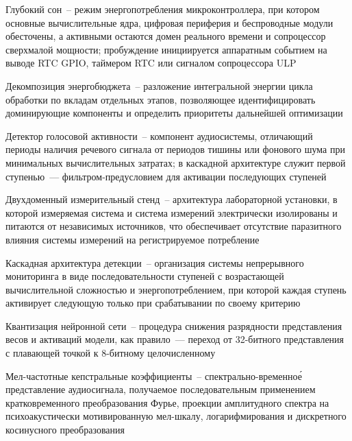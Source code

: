 
\begingroup
\setlength{\parindent}{0pt}
\setlength{\parskip}{0pt}
\newcommand{\term}[2]{%
	\noindent #1~-- #2\par
	\vspace{0.4em}
}

\term{Глубокий сон}{режим энергопотребления микроконтроллера, при котором основные вычислительные ядра, цифровая периферия и беспроводные модули обесточены, а активными остаются домен реального времени и сопроцессор сверхмалой мощности; пробуждение инициируется аппаратным событием на выводе RTC GPIO, таймером RTC или сигналом сопроцессора ULP}

\term{Декомпозиция энергобюджета}{разложение интегральной энергии цикла обработки по вкладам отдельных этапов, позволяющее идентифицировать доминирующие компоненты и определить приоритеты дальнейшей оптимизации}

\term{Детектор голосовой активности}{компонент аудиосистемы, отличающий периоды наличия речевого сигнала от периодов тишины или фонового шума при минимальных вычислительных затратах; в каскадной архитектуре служит первой ступенью~--- фильтром-предусловием для активации последующих ступеней}

\term{Двухдоменный измерительный стенд}{архитектура лабораторной установки, в которой измеряемая система и система измерений электрически изолированы и питаются от независимых источников, что обеспечивает отсутствие паразитного влияния системы измерений на регистрируемое потребление}

\term{Каскадная архитектура детекции}{организация системы непрерывного мониторинга в виде последовательности ступеней с возрастающей вычислительной сложностью и энергопотреблением, при которой каждая ступень активирует следующую только при срабатывании по своему критерию}

\term{Квантизация нейронной сети}{процедура снижения разрядности представления весов и активаций модели, как правило~--- переход от 32-битного представления с плавающей точкой к 8-битному целочисленному}

\term{Мел-частотные кепстральные коэффициенты}{спектрально-временно\'{е} представление аудиосигнала, получаемое последовательным применением кратковременного преобразования Фурье, проекции амплитудного спектра на психоакустически мотивированную мел-шкалу, логарифмирования и дискретного косинусного преобразования}

